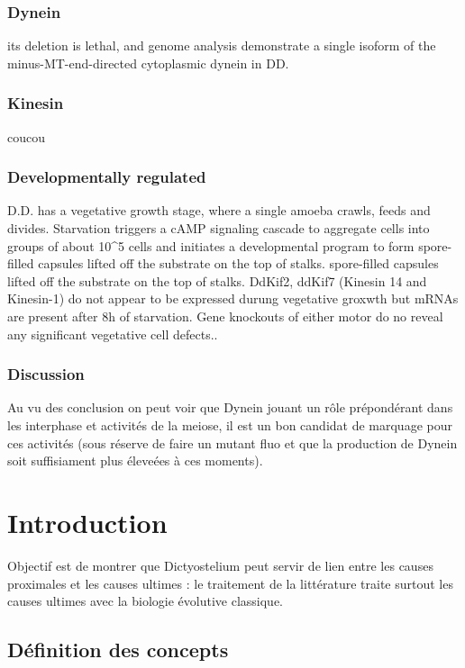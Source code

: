 \documentclass[twocolumn,10pt]{article} %
\begin{document}
    \subsubsection*{Dynein}
    its deletion is lethal, and genome analysis demonstrate a single isoform of the minus-MT-end-directed cytoplasmic dynein in DD. 
    \subsubsection*{Kinesin}
    coucou
    \subsubsection*{Developmentally regulated}
    D.D. has a vegetative growth stage, where a single amoeba crawls, feeds and divides. Starvation triggers a cAMP signaling cascade to aggregate cells into groups of about 10\^{}5 cells and initiates a developmental program to form spore-filled capsules lifted off the substrate on the top of stalks.
    spore-filled capsules lifted off the substrate on the top of stalks.
    DdKif2, ddKif7 (Kinesin 14 and Kinesin-1) do not appear to be expressed durung vegetative groxwth but mRNAs are present after 8h of starvation. 
    Gene knockouts of either motor do no reveal any significant vegetative cell defects.\cite{deHostos_1998}.

    \subsubsection*{Discussion}
    Au vu des conclusion on peut voir que Dynein jouant un rôle prépondérant dans les interphase et activités de la meiose,
    il est un bon candidat de marquage pour ces activités (sous réserve de faire un mutant fluo et que la production de 
    Dynein soit suffisiament plus éleveées à ces moments).

\section{Introduction}
Objectif est de montrer que Dictyostelium peut servir de lien entre les causes proximales et les causes ultimes :
le traitement de la littérature traite surtout les causes ultimes avec la biologie évolutive classique.
   
   
    \subsection{Définition des concepts}
    \cite{Haig_2003}
    \cite{Mayr_1961}
    
\end{document}
